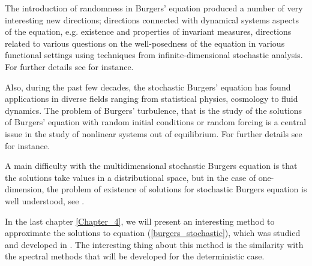     The introduction of randomness in Burgers' equation produced a number of very interesting new directions; directions connected with dynamical systems aspects of the equation, e.g. existence and properties of invariant measures, directions related to various questions on the well-posedness of the equation in various functional settings using techniques from infinite-dimensional stochastic analysis. For further details see \cite{KARDAR1986} for instance.
    
    Also, during the past few decades, the stochastic Burgers' equation has found applications in diverse fields ranging from statistical physics, cosmology to fluid dynamics. The problem of Burgers' turbulence, that is the study of the solutions of Burgers' equation with random initial conditions or random forcing is a central issue in the study of nonlinear systems out of equilibrium. For further details see \cite{WEINAN, KHANIN2007} for instance.
    
    A main difficulty with the multidimensional stochastic Burgers equation is that the solutions take values in a distributional space, but in the case of one-dimension, the problem of existence of solutions for stochastic Burgers equation is well understood, see \cite{BERTINI1994, Catuogno2014, DAPRATO1994, PERKOWSKI2015}. 
    
    In the last chapter \ref{Chapter_4}, we will present an interesting method to approximate the solutions to equation (\ref{burgers_stochastic}), which was studied and developed in \cite{Delgado2016}. The interesting thing about this method is the similarity with the spectral methods that will be developed for the deterministic case.